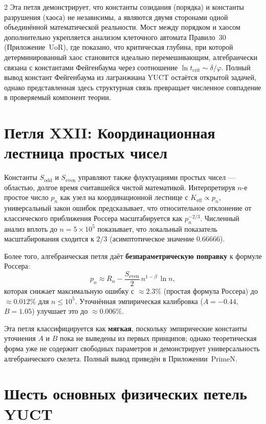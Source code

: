 \documentclass[12pt,a4paper]{article}
\begin{document}
\begin{multicols}{2}
		Эта петля демонстрирует, что константы созидания (порядка) и константы разрушения (хаоса) не независимы, а являются двумя сторонами одной объединённой математической реальности. Мост между порядком и хаосом дополнительно укрепляется анализом клеточного автомата Правило~30 (Приложение~UoR), где показано, что критическая глубина, при которой детерминированный хаос становится идеально перемешивающим, алгебраически связана с константами Фейгенбаума через соотношение \(\ln t_{\mathrm{crit}} \sim \delta/\varphi\). Полный вывод констант Фейгенбаума из лагранжиана YUCT остаётся открытой задачей, однако представленная здесь структурная связь превращает численное совпадение в проверяемый компонент теории.
		
		\section{Петля XXII: Координационная лестница простых чисел}
		
		Константы \(S_{\mathrm{odd}}\) и \(S_{\mathrm{even}}\) управляют также флуктуациями простых чисел — областью, долгое время считавшейся чистой математикой. Интерпретируя \(n\)-е простое число \(p_n\) как узел на координационной лестнице с \(K_{\mathrm{eff}} \propto p_n\), универсальный закон ошибок предсказывает, что относительное отклонение от классического приближения Россера масштабируется как \(p_n^{-2/3}\). Численный анализ вплоть до \(n = 5\times10^5\) показывает, что локальный показатель масштабирования сходится к \(2/3\) (асимптотическое значение \(0.66666\)).
		
		Более того, алгебраическая петля даёт \textbf{безпараметрическую поправку} к формуле Россера:
		\[
		p_n \approx R_n - \frac{S_{\mathrm{even}}}{2}\, n^{1-\beta}\,\ln n,
		\]
		которая снижает максимальную ошибку с \(\approx 2.3\%\) (простая формула Россера) до \(\approx 0.012\%\) для \(n\le 10^5\). Уточнённая эмпирическая калибровка (\(A = -0.44\), \(B = 1.05\)) улучшает это до \(\approx 0.006\%\).
		
		Эта петля классифицируется как \textbf{мягкая}, поскольку эмпирические константы уточнения \(A\) и \(B\) пока не выведены из первых принципов; однако теоретическая форма уже не содержит свободных параметров и демонстрирует универсальность алгебраического скелета. Полный вывод приведён в Приложении~PrimeN.
		
	\end{multicols}
	
	\section*{Шесть основных физических петель YUCT}
	
\end{document}
